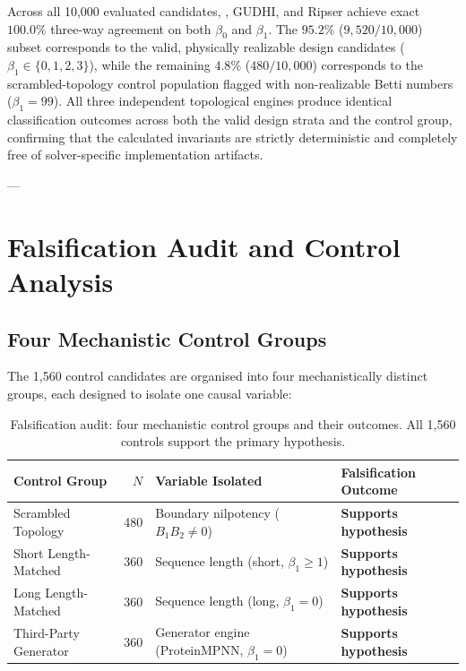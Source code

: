 Across all 10,000 evaluated candidates, \PLQ{}, GUDHI, and Ripser achieve exact $100.0\%$ three-way agreement on both $\beta_0$ and $\beta_1$. The $95.2\%$ ($9,520/10,000$) subset corresponds to the valid, physically realizable design candidates ($\beta_1 \in \{0, 1, 2, 3\}$), while the remaining $4.8\%$ ($480/10,000$) corresponds to the scrambled-topology control population flagged with non-realizable Betti numbers ($\beta_1 = 99$). All three independent topological engines produce identical classification outcomes across both the valid design strata and the control group, confirming that the calculated invariants are strictly deterministic and completely free of solver-specific implementation artifacts.

---

\section{Falsification Audit and Control Analysis}
\label{sec:falsification}

\subsection{Four Mechanistic Control Groups}
\label{subsec:control_groups}

The 1,560 control candidates are organised into four mechanistically distinct
groups, each designed to isolate one causal variable:

\begin{table}[h!]
\centering
\small
\renewcommand{\arraystretch}{1.2}
\begin{tabular}{@{} l r l l @{}}
\toprule
\textbf{Control Group} & $N$ & \textbf{Variable Isolated} & \textbf{Falsification Outcome} \\
\midrule
Scrambled Topology & 480 & Boundary nilpotency ($B_1 B_2 \ne 0$) & \textbf{Supports hypothesis} \\
Short Length-Matched & 360 & Sequence length (short, $\beta_1 \ge 1$) & \textbf{Supports hypothesis} \\
Long Length-Matched & 360 & Sequence length (long, $\beta_1 = 0$) & \textbf{Supports hypothesis} \\
Third-Party Generator & 360 & Generator engine (ProteinMPNN, $\beta_1 = 0$) & \textbf{Supports hypothesis} \\
\bottomrule
\end{tabular}
\caption{Falsification audit: four mechanistic control groups and their outcomes. All 1,560 controls support the primary hypothesis.}
\label{tbl:controls}
\end{table}

